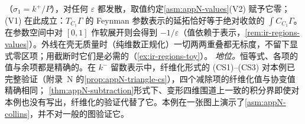 \begin{example}
（$\sigma_1=k^+/P$），对任何 $\varepsilon$ 都发散，取值约定\cref{asm:appN-values}(V2) 赋予它零；(V1) 在此成立：$T_{C_1}\Gamma$ 的 Feynman 参数表示的延拓恰好等于绝对收敛的 $\int C_{C_1}\Gamma$。
在参数空间中对 $[0,1]$ 作软展开则会得到 $-1/\varepsilon$（值依赖于表示，\cref{rem:ir-regions-values}）。外线在壳无质量时（纯维数正规化）一切两两重叠都无标度，不留下显式零区项；用截断时它们是必需的（\cref{ex:ir-regions-toy}）。
\emph{地位。}恒等式、各项的值与余项都是精确的。在 $k^-$ 留数表示中，纤维化形式的 (CS1)--(CS3) 对本例已完整验证（附录~N 的\cref{prop:appN-triangle-cs}），四个减除项的纤维化值与协变值精确相同；
\cref{thm:appN-subtraction}形式下、变形四维围道上一致的积分界即使对本例也没有写出，纤维化的验证代替了它。本例在一张图上演示了\cref{asm:appN-collins}，并不对一般的图验证它。
\end{example}

